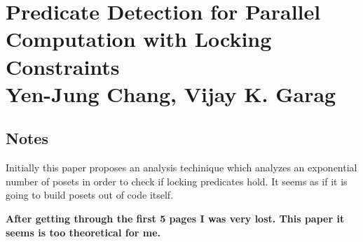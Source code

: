 \section{ Predicate Detection for Parallel Computation with Locking Constraints \\ \small{Yen-Jung Chang, Vijay K. Garag}}

\subsection{Notes}

Initially this paper proposes an analysis techinique which analyzes an
exponential number of posets in order to check if locking predicates hold. It
seems as if it is going to build posets out of code itself.

\textbf{After getting through the first 5 pages I was very lost. This paper it seems is too theoretical for me. }
